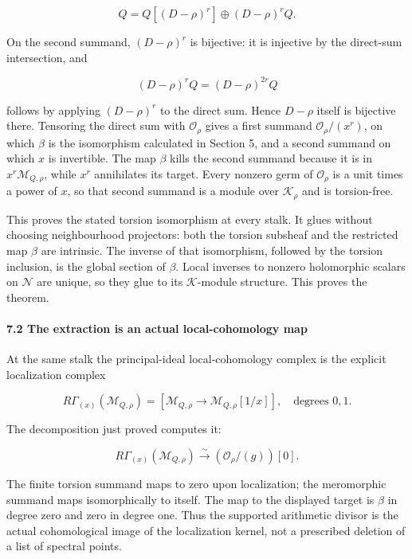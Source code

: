 \[Q=Q[(D-\rho)^r]\oplus (D-\rho)^rQ.\]

On the second summand, \((D-\rho)^r\) is bijective: it is injective by the direct-sum intersection,
and

\[(D-\rho)^rQ=(D-\rho)^{2r}Q\]

follows by applying \((D-\rho)^r\) to the direct sum. Hence \(D-\rho\) itself is bijective there.
Tensoring the direct sum with \(\mathcal O_\rho\) gives a first summand \(\mathcal O_\rho/(x^r)\),
on which \(\beta\) is the isomorphism calculated in Section 5, and a second summand on which \(x\)
is invertible. The map \(\beta\) kills the second summand because it is in
\(x^r\mathcal M_{Q,\rho}\), while \(x^r\) annihilates its target. Every nonzero germ of
\(\mathcal O_\rho\) is a unit times a power of \(x\), so that second summand is a module over
\(\mathcal K_\rho\) and is torsion-free.

This proves the stated torsion isomorphism at every stalk. It glues without choosing neighbourhood
projectors: both the torsion subsheaf and the restricted map \(\beta\) are intrinsic. The inverse of
that isomorphism, followed by the torsion inclusion, is the global section of \(\beta\). Local
inverses to nonzero holomorphic scalars on \(\mathcal N\) are unique, so they glue to its
\(\mathcal K\)-module structure. This proves the theorem.

\paragraph{7.2 The extraction is an actual local-cohomology
map}\label{pr_8:the-extraction-is-an-actual-local-cohomology-map}

At the same stalk the principal-ideal local-cohomology complex is the explicit localization complex

\[R\Gamma_{(x)}(\mathcal M_{Q,\rho})
=[\mathcal M_{Q,\rho}\longrightarrow\mathcal M_{Q,\rho}[1/x]],
\quad\text{degrees }0,1.\]

The decomposition just proved computes it:

\[\boxed{R\Gamma_{(x)}(\mathcal M_{Q,\rho})
\xrightarrow{\sim}(\mathcal O_\rho/(g))[0].}\]

The finite torsion summand maps to zero upon localization; the meromorphic summand maps
isomorphically to itself. The map to the displayed target is \(\beta\) in degree zero and zero in
degree one. Thus the supported arithmetic divisor is the actual cohomological image of the
localization kernel, not a prescribed deletion of a list of spectral points.

